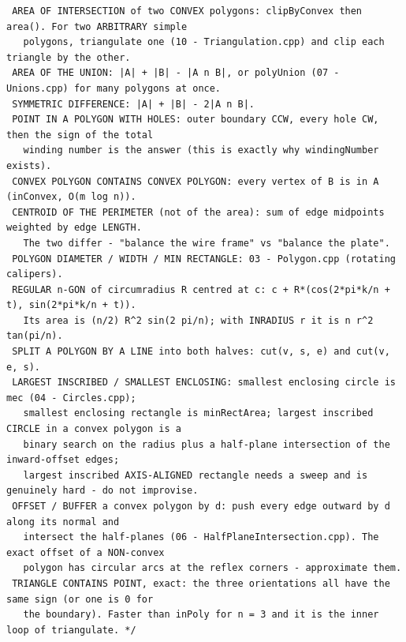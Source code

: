 \documentclass[9pt,a4paper,twocolumn]{extarticle}
\begin{document}
\begin{lstlisting}
 AREA OF INTERSECTION of two CONVEX polygons: clipByConvex then area(). For two ARBITRARY simple
   polygons, triangulate one (10 - Triangulation.cpp) and clip each triangle by the other.
 AREA OF THE UNION: |A| + |B| - |A n B|, or polyUnion (07 - Unions.cpp) for many polygons at once.
 SYMMETRIC DIFFERENCE: |A| + |B| - 2|A n B|.
 POINT IN A POLYGON WITH HOLES: outer boundary CCW, every hole CW, then the sign of the total
   winding number is the answer (this is exactly why windingNumber exists).
 CONVEX POLYGON CONTAINS CONVEX POLYGON: every vertex of B is in A (inConvex, O(m log n)).
 CENTROID OF THE PERIMETER (not of the area): sum of edge midpoints weighted by edge LENGTH.
   The two differ - "balance the wire frame" vs "balance the plate".
 POLYGON DIAMETER / WIDTH / MIN RECTANGLE: 03 - Polygon.cpp (rotating calipers).
 REGULAR n-GON of circumradius R centred at c: c + R*(cos(2*pi*k/n + t), sin(2*pi*k/n + t)).
   Its area is (n/2) R^2 sin(2 pi/n); with INRADIUS r it is n r^2 tan(pi/n).
 SPLIT A POLYGON BY A LINE into both halves: cut(v, s, e) and cut(v, e, s).
 LARGEST INSCRIBED / SMALLEST ENCLOSING: smallest enclosing circle is mec (04 - Circles.cpp);
   smallest enclosing rectangle is minRectArea; largest inscribed CIRCLE in a convex polygon is a
   binary search on the radius plus a half-plane intersection of the inward-offset edges;
   largest inscribed AXIS-ALIGNED rectangle needs a sweep and is genuinely hard - do not improvise.
 OFFSET / BUFFER a convex polygon by d: push every edge outward by d along its normal and
   intersect the half-planes (06 - HalfPlaneIntersection.cpp). The exact offset of a NON-convex
   polygon has circular arcs at the reflex corners - approximate them.
 TRIANGLE CONTAINS POINT, exact: the three orientations all have the same sign (or one is 0 for
   the boundary). Faster than inPoly for n = 3 and it is the inner loop of triangulate. */
\end{lstlisting}

\filbreak
\end{document}
